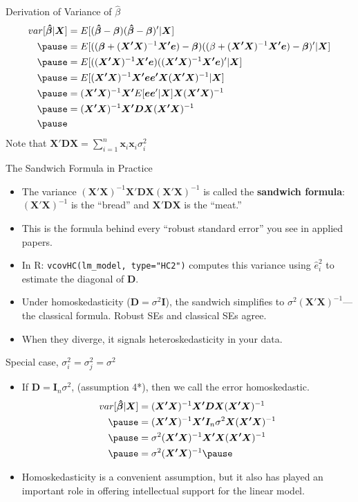 \documentclass[aspectratio=169, handout]{beamer}
\numberwithin{equation}{section}
\begin{document}
\begin{frame}{Derivation of Variance of $\hat{\beta}$}
\begin{align*}
var[\bm{\hat{\beta}}|\bm{X}]&=E[(\bm{\hat{\beta}}-\bm{\beta})(\bm{\hat{\beta}}-\bm{\beta})'|\bm{X}]\\ \pause
&=E[((\bm{\beta}+(\bm{X'X})^{-1}\bm{X'e})-\bm{\beta})((\beta+(\bm{X'X})^{-1}\bm{X'e})-\bm{\beta})'|\bm{X}]\\ \pause
&=E[((\bm{X'X})^{-1}\bm{X'e})((\bm{X'X})^{-1}\bm{X'e})'|\bm{X}]\\ \pause
&=E[(\bm{X'X})^{-1}\bm{X'e}\bm{e'X}(\bm{X'X})^{-1}|\bm{X}]\\ \pause
&=(\bm{X'X})^{-1}\bm{X'}E[\bm{e}\bm{e}'|\bm{X}]\bm{X}(\bm{X'X})^{-1}\\ \pause
&=(\bm{X'X})^{-1}\bm{X'}\bm{D}\bm{X}(\bm{X'X})^{-1}\\ \pause
\end{align*}
Note that $\bm{X'}\bm{D}\bm{X}=\sum_{i=1}^n\bm{x}_i\bm{x}_i\sigma_i^2$
\end{frame}

\begin{frame}{The Sandwich Formula in Practice}
\begin{itemize}
\item The variance $(\bm{X'X})^{-1}\bm{X'DX}(\bm{X'X})^{-1}$ is called the \textbf{sandwich formula}: $\bm{(X'X)}^{-1}$ is the ``bread'' and $\bm{X'DX}$ is the ``meat.''\pause
\item This is the formula behind every ``robust standard error'' you see in applied papers.\pause
\item In R: \texttt{vcovHC(lm\_model, type="HC2")} computes this variance using $\hat{e}_i^2$ to estimate the diagonal of $\bm{D}$.\pause
\item Under homoskedasticity ($\bm{D}=\sigma^2\bm{I}$), the sandwich simplifies to $\sigma^2(\bm{X'X})^{-1}$---the classical formula. Robust SEs and classical SEs agree.
\item When they diverge, it signals heteroskedasticity in your data.
\end{itemize}
\end{frame}

\begin{frame}{Special case, $\sigma^2_i=\sigma^2_j=\sigma^2$}
\begin{itemize}
\item If $\bm{D}=\bm{I}_n\sigma^2$, (assumption 4*), then we call the error homoskedastic.
\begin{align*}
var[\bm{\hat{\beta}}|\bm{X}]&=(\bm{X'X})^{-1}\bm{X'}\bm{D}\bm{X}(\bm{X'X})^{-1}\\ \pause
&=(\bm{X'X})^{-1}\bm{X'}\bm{I}_n\sigma^2\bm{X}(\bm{X'X})^{-1}\\ \pause
&=\sigma^2(\bm{X'X})^{-1}\bm{X'}\bm{X}(\bm{X'X})^{-1}\\ \pause
&=\sigma^2(\bm{X'X})^{-1} \pause
\end{align*}
\item Homoskedasticity is a convenient assumption, but it also has played an important role in offering intellectual support for the linear model.
\end{itemize}
\end{frame}
\end{document}
